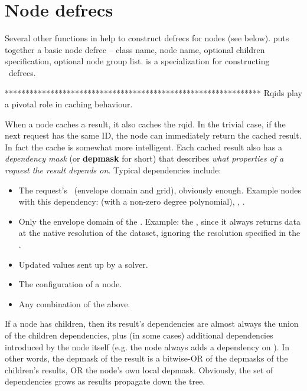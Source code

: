 \documentclass[10pt,twoside]{book}
\begin{document}
\section{Node defrecs}

  Several other functions in  help to construct defrecs for
  nodes (see below).  puts together a basic node defrec -- class
  name, node name, optional children specification, optional node group
  list.  is a specialization for constructing \Parm\ defrecs.


**************************************************************    
  Rqids play a pivotal role in caching behaviour. 
  
  When a node caches a result,
  it also caches the rqid. In the trivial case, if the next request has the
  same ID, the node can immediately return the cached result. In fact the cache
  is somewhat more intelligent. Each cached result also has a {\em dependency
  mask} (or {\bf depmask} for short) that describes {\em what properties of a
  request the result depends on}. Typical dependencies include:

  \begin{itemize} 
  
  \item The request's \Cells\ (envelope domain and grid), obviously enough.
  Example nodes with this dependency:  (with a non-zero degree
  polynomial), , . 

  \item Only the envelope domain of the \Cells. Example: the , since
  it always returns data at the native resolution of the dataset, ignoring the
  resolution specified in the \Cells.

  \item Updated  values sent up by a solver.
  
  \item The configuration of a  node.

  \item Any combination of the above. 

  \end{itemize}
  
  If a node has children, then its result's dependencies are almost always the
  union of the children dependencies, plus (in some cases) additional
  dependencies introduced by the node itself (e.g. the  node always
  adds a dependency on \Cells). In other words, the depmask of the result is 
  a bitwise-OR of the depmasks of the children's results, OR the node's own
  local depmask. Obviously, the set of dependencies grows as results propagate
  down the tree.
\end{document}
